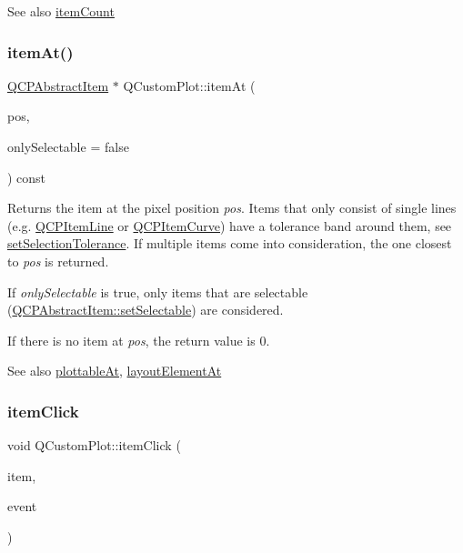 \begin{DoxySeeAlso}{See also}
\mbox{\hyperlink{class_q_custom_plot_a16025daf0341f9362be3080e404424c2}{item\+Count}} 
\end{DoxySeeAlso}
\mbox{\label{class_q_custom_plot_ac08578e0e6c059c83a8d340ba0038e8e}} 
\subsubsection{\texorpdfstring{itemAt()}{itemAt()}}
{\footnotesize\ttfamily \mbox{\hyperlink{class_q_c_p_abstract_item}{Q\+C\+P\+Abstract\+Item}} $\ast$ Q\+Custom\+Plot\+::item\+At (\begin{DoxyParamCaption}\item[{const Q\+PointF \&}]{pos,  }\item[{bool}]{only\+Selectable = {\ttfamily false} }\end{DoxyParamCaption}) const}

Returns the item at the pixel position {\itshape pos}. Items that only consist of single lines (e.\+g. \mbox{\hyperlink{class_q_c_p_item_line}{Q\+C\+P\+Item\+Line}} or \mbox{\hyperlink{class_q_c_p_item_curve}{Q\+C\+P\+Item\+Curve}}) have a tolerance band around them, see \mbox{\hyperlink{class_q_custom_plot_a4dc31241d7b09680950e19e5f971ed93}{set\+Selection\+Tolerance}}. If multiple items come into consideration, the one closest to {\itshape pos} is returned.

If {\itshape only\+Selectable} is true, only items that are selectable (\mbox{\hyperlink{class_q_c_p_abstract_item_a8a8e32a55bc478b849756a78c2d87fd2}{Q\+C\+P\+Abstract\+Item\+::set\+Selectable}}) are considered.

If there is no item at {\itshape pos}, the return value is 0.

\begin{DoxySeeAlso}{See also}
\mbox{\hyperlink{class_q_custom_plot_acddbbd8b16dd633f0d94e5a736fbd8cf}{plottable\+At}}, \mbox{\hyperlink{class_q_custom_plot_afaa1d304e0287d140fd238e90889ef3c}{layout\+Element\+At}} 
\end{DoxySeeAlso}
\mbox{\label{class_q_custom_plot_ae16b51f52d2b7aebbc7e3e74e6ff2e4b}} 
\subsubsection{\texorpdfstring{itemClick}{itemClick}}
{\footnotesize\ttfamily void Q\+Custom\+Plot\+::item\+Click (\begin{DoxyParamCaption}\item[{\mbox{\hyperlink{class_q_c_p_abstract_item}{Q\+C\+P\+Abstract\+Item}} $\ast$}]{item,  }\item[{Q\+Mouse\+Event $\ast$}]{event }\end{DoxyParamCaption})\hspace{0.3cm}{\ttfamily [signal]}}

